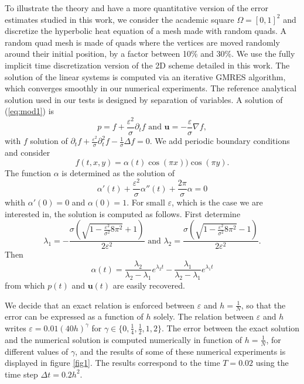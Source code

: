 \documentclass[a4paper,french,english,10pt]{article}
\newcommand\eps{\varepsilon}
\begin{document}
To illustrate the theory and have a more quantitative version of the error estimates
studied in this work, we consider the academic square $\Omega=[0,1]^2$ and discretize the hyperbolic heat equation
of a mesh made with random quads. 
A random quad mesh is made of quads where the vertices are moved
randomly around their initial position, by a factor between 10\% and 30\%.
We use the fully implicit time discretization version of the 2D scheme
detailed in this work. The solution of the linear systems is computed via
an iterative GMRES algorithm, which converges smoothly in our numerical experiments.
The reference analytical solution used in our tests is designed by separation of variables.
A solution of (\ref{eq:mod1}) is
$$
p= f+\frac{\eps^2}\sigma \partial_t f
\mbox{ and }
\mathbf u= -\frac\eps \sigma \nabla f,
$$
with $f$ solution of 
$
\partial_t f +\frac{\eps^2}\sigma \partial_t^2 f -\frac1\sigma \Delta f=0$.
We add periodic boundary conditions and consider
$$
f(t,x,y)=\alpha(t)\cos (\pi x ))\cos( \pi y ).
$$
The function $\alpha$ is determined as the solution of
$$
\alpha'(t)+ \frac{\eps^2}\sigma\alpha''(t)+\frac{2\pi}\sigma \alpha=0
$$
whith $\alpha'(0)=0$ and $\alpha(0)=1$.
For small $\eps$, which is the case we are interested in, the solution is computed as follows.
First determine 
$$
\lambda_1=-
\frac{
\sigma \left( \sqrt{1-\frac{\eps^2}{\sigma^2}  8 \pi^2  } +1\right)
}{2 \eps^2  }
\mbox{ and }
\lambda_2=
\frac{
\sigma \left( \sqrt{1-\frac{\eps^2}{\sigma^2}  8 \pi^2  } -1\right)
}{2 \eps^2  }.
$$
Then 
$$
\alpha(t)=\frac{\lambda_2}{\lambda_2-\lambda_1}e^{\lambda_2 t  }
-
\frac{\lambda_1}{\lambda_2-\lambda_1}e^{\lambda_1 t  }
$$
from which $p(t)$ and $\mathbf u(t)$ are easily recovered.

We decide that an exact relation is enforced between
$\eps$ and $h=\frac1N$, so that the error can be expressed as a function of $h$ solely.
The relation between $\eps$ and $h$ writes
$\eps=0.01 (40h)^\gamma$ for $\gamma \in\{0,\frac14, \frac12, 1, 2  \}$.
The error between the exact solution and the numerical solution is computed numerically
in function of $h=\frac1N$, for different values of $\gamma$, and the results of some of these numerical experiments is
displayed in figure \ref{fig1}. The results correspond  to the  time $T = 0.02$ using the time step 
$\Delta t = 0.2 h^2$.
\end{document}
